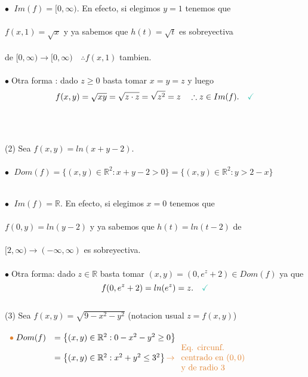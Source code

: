 \documentclass{article}
\theoremstyle{definition}
\theoremstyle{definition}
\theoremstyle{remark}
\newcommand\bl{$\bullet\;$}
\newcommand\ok{\checkmark}
\begin{document}
\textcolor{rojop2}{\bl} $Im(f)=[0,\infty)$. En efecto, si elegimos $y=1$ tenemos que \\\\ \phantom{\textcolor{rojop2}{\bl} $Im(f)=[$}$f(x,1) = \sqrt{x}$ y ya sabemos que $h(t) = \sqrt{t}$ es sobreyectiva \\\\ \phantom{\textcolor{rojop2}{\bl} $Im(f)=[$}de $[0,\infty) \to [0,\infty) \quad \therefore f(x,1)$ tambien. \\\\
\bl Otra forma : dado $z \geq 0 $ basta tomar $x=y=z$ y luego \[ 
  f(x,y)=\sqrt{xy} = \sqrt{z \cdot z} = \sqrt{z^2} = z \quad \therefore z \in Im(f). \quad \textcolor{verdep2}{\ok}
\]
\\\\ \pagebreak \\
\textcolor{verdep2}{(2)} Sea $f(x,y)=ln(x+y-2).$\\\\
\textcolor{rojop2}{\bl} \;  $Dom(f)=\big\{(x,y) \in \mathbb{R}^2 : x+y-2>0\big\} = \big\{(x,y) \in \mathbb{R}^2 : y > 2 - x \big\}$ \\
\begin{figure}[h]
\centering
\def\svgwidth{0.45\textwidth}

\end{figure}
\\
\textcolor{rojop2}{\bl} $Im(f)=\mathbb{R}$. \quad En efecto, si elegimos $x=0$ tenemos que \\\\
\phantom{\textcolor{rojop2}{\bl} $Im(f)$} $f(0,y)=ln(y-2)$ y ya sabemos que $h(t)=ln(t-2)$ de \\\\
\phantom{\textcolor{rojop2}{\bl} $Im(f)$} $[2,\infty) \to (-\infty,\infty)$ es sobreyectiva. \\\\
\bl Otra forma: dado $z \in \mathbb{R}$ basta tomar $(x,y)=(0,e^z+2) \in Dom(f)$ ya que \[
  f(0,e^z+2)=ln(e^z)=z. \quad \textcolor{verdep2}{\ok}
\] \pagebreak \\
\textcolor{verdep2}{(3)} Sea $f(x,y)=\sqrt{9-x^2-y^2}$ \quad \quad \big(notacion usual $z=f(x,y)$\big)\\\\
 \; $\begin{array}{ll}
 \textcolor{rojop2}{\bullet}\; Dom(f) &=\left\{(x,y)\in\mathbb{R}^2 : 0-x^2-y^2 \geq 0 \right\}\\ & =\left\{(x,y) \in \mathbb{R}^2 : x^2+y^2 \leq 3^2\right\} \textcolor{rojop2}{\to \begin{array}{l} \text{Eq. circunf.} \\
    \text{centrado en } (0,0) \\
\text{y de radio } 3\end{array}}\end{array}$
\end{document}
